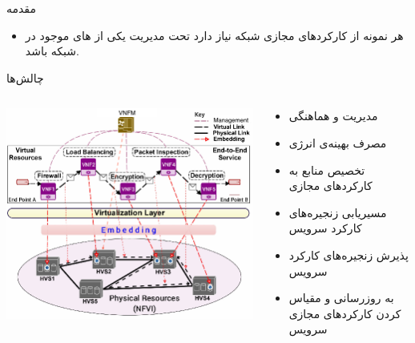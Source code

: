 \documentclass{beamer}
\makeatletter
\newcommand{\RTList}{\raggedleft\rightskip\@totalleftmargin}
\makeatother
\begin{document}
\begin{persian}
\begin{frame}{مقدمه}
\begin{itemize}
        \item هر نمونه از کارکردهای مجازی شبکه نیاز دارد تحت مدیریت یکی از های موجود در شبکه باشد.
    \end{itemize}
\end{frame}
\begin{frame}{چالش‌ها} %
    \begin{columns}
        \begin{column}{0.6\textwidth}
            \includegraphics[scale=0.35]{images/embedding.png}
        \end{column}
        \begin{column}{0.4\textwidth}
            \begin{itemize}\RTList{}
                \item مدیریت و هماهنگی
                \item مصرف بهینه‌ی انرژی
                \item تخصیص منابع به کارکردهای مجازی
                \item مسیریابی زنجیره‌های کارکرد سرویس
                \item پذیرش زنجیره‌های کارکرد سرویس
                \item به روزرسانی و مقیاس کردن کارکردهای مجازی سرویس
            \end{itemize}
        \end{column}
    \end{columns}

\end{frame}
\end{persian}
\end{document}
